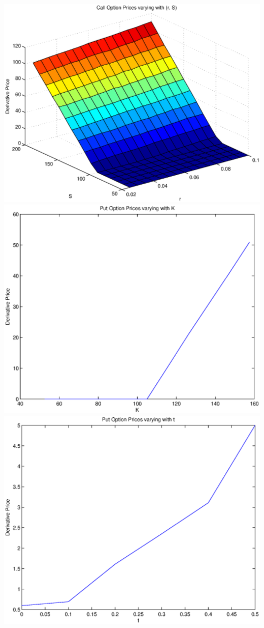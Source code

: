 \documentclass{article}
\begin{document}
\includegraphics[width=\textwidth]{Call_Option_Prices_varying_with_(r,_S)}
\includegraphics[width=\textwidth]{Put_Option_Prices_varying_with_K}
\includegraphics[width=\textwidth]{Put_Option_Prices_varying_with_t}
\end{document}

